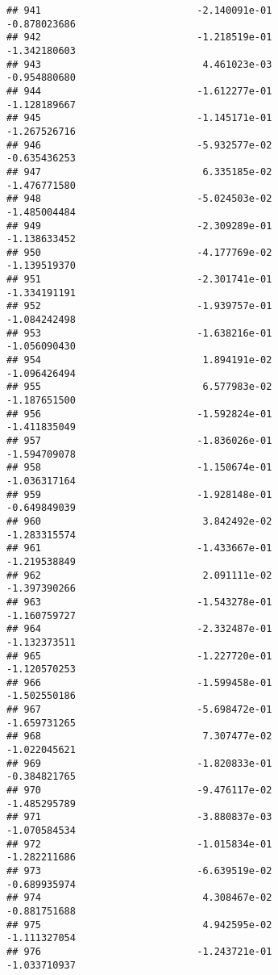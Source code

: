 \documentclass[
]{article}
\begin{document}
\begin{verbatim}
## 941                           -2.140091e-01               -0.878023686
## 942                           -1.218519e-01               -1.342180603
## 943                            4.461023e-03               -0.954880680
## 944                           -1.612277e-01               -1.128189667
## 945                           -1.145171e-01               -1.267526716
## 946                           -5.932577e-02               -0.635436253
## 947                            6.335185e-02               -1.476771580
## 948                           -5.024503e-02               -1.485004484
## 949                           -2.309289e-01               -1.138633452
## 950                           -4.177769e-02               -1.139519370
## 951                           -2.301741e-01               -1.334191191
## 952                           -1.939757e-01               -1.084242498
## 953                           -1.638216e-01               -1.056090430
## 954                            1.894191e-02               -1.096426494
## 955                            6.577983e-02               -1.187651500
## 956                           -1.592824e-01               -1.411835049
## 957                           -1.836026e-01               -1.594709078
## 958                           -1.150674e-01               -1.036317164
## 959                           -1.928148e-01               -0.649849039
## 960                            3.842492e-02               -1.283315574
## 961                           -1.433667e-01               -1.219538849
## 962                            2.091111e-02               -1.397390266
## 963                           -1.543278e-01               -1.160759727
## 964                           -2.332487e-01               -1.132373511
## 965                           -1.227720e-01               -1.120570253
## 966                           -1.599458e-01               -1.502550186
## 967                           -5.698472e-01               -1.659731265
## 968                            7.307477e-02               -1.022045621
## 969                           -1.820833e-01               -0.384821765
## 970                           -9.476117e-02               -1.485295789
## 971                           -3.880837e-03               -1.070584534
## 972                           -1.015834e-01               -1.282211686
## 973                           -6.639519e-02               -0.689935974
## 974                            4.308467e-02               -0.881751688
## 975                            4.942595e-02               -1.111327054
## 976                           -1.243721e-01               -1.033710937

\end{verbatim}
\end{document}
